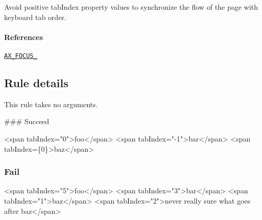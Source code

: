Avoid positive tab\+Index property values to synchronize the flow of the page with keyboard tab order.

\paragraph*{References}


\begin{DoxyEnumerate}
\item \href{https://github.com/GoogleChrome/accessibility-developer-tools/wiki/Audit-Rules#ax_focus_03}{\tt A\+X\+\_\+\+F\+O\+C\+U\+S\+\_}
\end{DoxyEnumerate}

\subsection*{Rule details}

This rule takes no arguments.

\#\#\# Succeed 
\begin{DoxyCode}
<span tabIndex="0">foo</span>
<span tabIndex="-1">bar</span>
<span tabIndex=\{0\}>baz</span>
\end{DoxyCode}


\subsubsection*{Fail}


\begin{DoxyCode}
<span tabIndex="5">foo</span>
<span tabIndex="3">bar</span>
<span tabIndex="1">baz</span>
<span tabIndex="2">never really sure what goes after baz</span>
\end{DoxyCode}
 